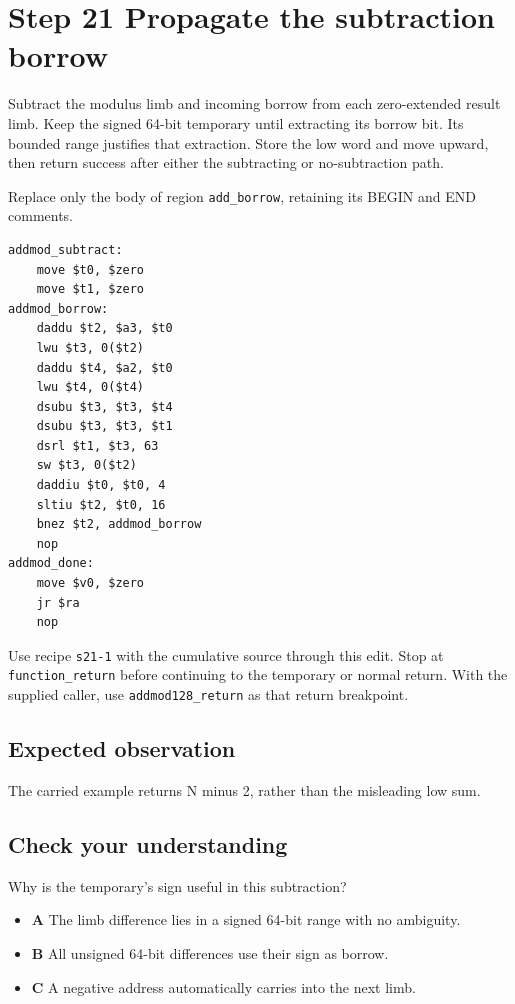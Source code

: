 \section{Step 21 Propagate the subtraction borrow}\label{rsa-s21}

Subtract the modulus limb and incoming borrow from each zero-extended result limb. Keep the signed 64-bit temporary until extracting its borrow bit. Its bounded range justifies that extraction. Store the low word and move upward, then return success after either the subtracting or no-subtraction path.

Replace only the body of region \texttt{add\_borrow}, retaining its BEGIN and END comments.

\begin{verbatim}
addmod_subtract:
    move $t0, $zero
    move $t1, $zero
addmod_borrow:
    daddu $t2, $a3, $t0
    lwu $t3, 0($t2)
    daddu $t4, $a2, $t0
    lwu $t4, 0($t4)
    dsubu $t3, $t3, $t4
    dsubu $t3, $t3, $t1
    dsrl $t1, $t3, 63
    sw $t3, 0($t2)
    daddiu $t0, $t0, 4
    sltiu $t2, $t0, 16
    bnez $t2, addmod_borrow
    nop
addmod_done:
    move $v0, $zero
    jr $ra
    nop
\end{verbatim}

Use recipe \texttt{s21-1} with the cumulative source through this edit. Stop at \texttt{function\_return} before continuing to the temporary or normal return. With the supplied caller, use \texttt{addmod128\_return} as that return breakpoint.

\subsection{Expected observation}
The carried example returns N minus 2, rather than the misleading low sum.

\subsection{Check your understanding}
Why is the temporary's sign useful in this subtraction?

\begin{itemize}
  \item \textbf{A} The limb difference lies in a signed 64-bit range with no ambiguity.
  \item \textbf{B} All unsigned 64-bit differences use their sign as borrow.
  \item \textbf{C} A negative address automatically carries into the next limb.
\end{itemize}
